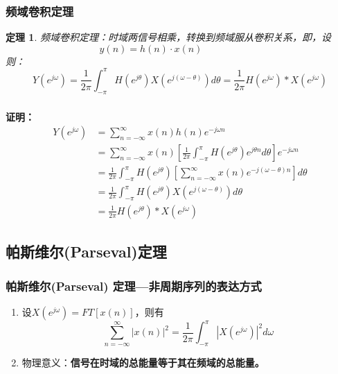 \documentclass[notheorems,compress,mathserif,table]{beamer}
\newtheorem{theorem}{定理}
\begin{document}
\begin{frame}\frametitle{频域卷积定理}%
\begin{theorem}
频域卷积定理：时域两信号相乘，转换到频域服从卷积关系，即，设
$$ y(n)=h(n)\cdot x(n)  \quad\quad\quad\quad\quad\quad\mbox{}$$
则：
$$
Y(e^{j\omega})= \frac{1}{2\pi}\int_{-\pi}^{\pi}H(e^{j\theta})X(e^{j(\omega-\theta)})d\theta=\frac{1}{2\pi}H(e^{j\omega})\ast X(e^{j\omega})
$$


\end{theorem}
\end{frame}



\begin{frame}\frametitle{}%
\textbf{证明：}
\begin{equation*}
\begin{split}
Y(e^{j\omega})  &= \sum_{n=-\infty}^{\infty}x(n)h(n)e^{-j\omega n} \\
&= \sum_{n=-\infty}^{\infty}x(n)\left[\frac{1}{2\pi}
\int_{-\pi}^{\pi}H(e^{j\theta})e^{j\theta n}d\theta\right]e^{-j\omega n}  \\
&=  \frac{1}{2\pi}\int_{-\pi}^{\pi}H(e^{j\theta})
\left[\sum_{n=-\infty}^{\infty}x(n)e^{-j(\omega-\theta) n}\right]d\theta\\
&= \frac{1}{2\pi}\int_{-\pi}^{\pi}H(e^{j\theta})X(e^{j(\omega-\theta)})d\theta \\
&= \frac{1}{2\pi}H(e^{j\theta})*X(e^{j\omega})
\end{split}
\end{equation*}
\end{frame}

\subsection*{帕斯维尔(Parseval)定理}

\begin{frame}\frametitle{帕斯维尔(Parseval) 定理—非周期序列的表达方式}%
\begin{enumerate}
\item 设$X(e^{j\omega})=FT[x(n)]$，则有
\begin{equation*}
\sum_{n=-\infty}^{\infty}|x(n)|^{2} = \frac{1}{2\pi}\int_{-\pi}^{\pi}|X(e^{j\omega})|^{2}d\omega
\end{equation*}
\item 物理意义：\textbf{信号在时域的总能量等于其在频域的总能量。}

\end{enumerate}
\end{frame}
\end{document}
